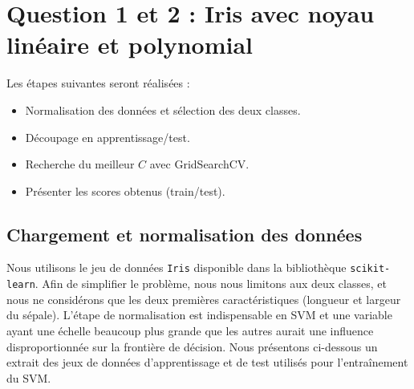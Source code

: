 \documentclass[12pt]{article}
\begin{document}
\section{Question 1 et 2 : Iris avec noyau linéaire et polynomial}
Les étapes suivantes seront réalisées :
\begin{itemize}
  \item Normalisation des données et sélection des deux classes.
  \item Découpage en apprentissage/test.
  \item Recherche du meilleur $C$ avec GridSearchCV.
  \item Présenter les scores obtenus (train/test).
\end{itemize}

\subsection{Chargement et normalisation des données}

Nous utilisons le jeu de données \texttt{Iris} disponible dans la bibliothèque \texttt{scikit-learn}. 
Afin de simplifier le problème, nous nous limitons aux deux classes, 
et nous ne considérons que les deux premières caractéristiques (longueur et largeur du sépale).
\newline
L'étape de normalisation est indispensable en SVM et une variable ayant une échelle beaucoup plus grande que les autres aurait une influence disproportionnée sur la frontière de décision. Nous présentons ci-dessous un extrait des jeux de données 
d’apprentissage et de test utilisés pour l’entraînement du SVM. 
\end{document}
